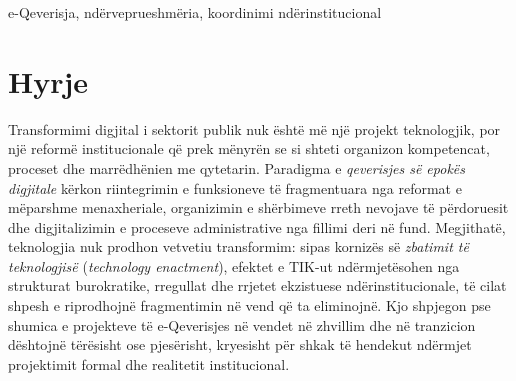 \documentclass[conference]{IEEEtran}
\begin{document}
\maketitle
\begin{IEEEkeywords}
e-Qeverisja, ndërveprueshmëria, koordinimi ndërinstitucional
\end{IEEEkeywords}
\section{Hyrje}
\label{sec:hyrje}
Transformimi digjital i sektorit publik nuk është më një projekt
teknologjik, por një reformë institucionale që prek mënyrën se si shteti
organizon kompetencat, proceset dhe marrëdhënien me qytetarin. Paradigma e
\textit{qeverisjes së epokës digjitale} kërkon riintegrimin e funksioneve të
fragmentuara nga reformat e mëparshme menaxheriale, organizimin e
shërbimeve rreth nevojave të përdoruesit dhe digjitalizimin e proceseve
administrative nga fillimi deri në fund. Megjithatë,
teknologjia nuk prodhon vetvetiu transformim: sipas kornizës së
\textit{zbatimit të teknologjisë} (\textit{technology enactment}), efektet e
TIK-ut ndërmjetësohen nga strukturat burokratike, rregullat dhe rrjetet
ekzistuese ndërinstitucionale, të cilat shpesh e riprodhojnë fragmentimin në
vend që ta eliminojnë. Kjo shpjegon pse shumica e
projekteve të e-Qeverisjes në vendet në zhvillim dhe në tranzicion dështojnë
tërësisht ose pjesërisht, kryesisht për shkak të hendekut ndërmjet
projektimit formal dhe realitetit institucional.
\end{document}
